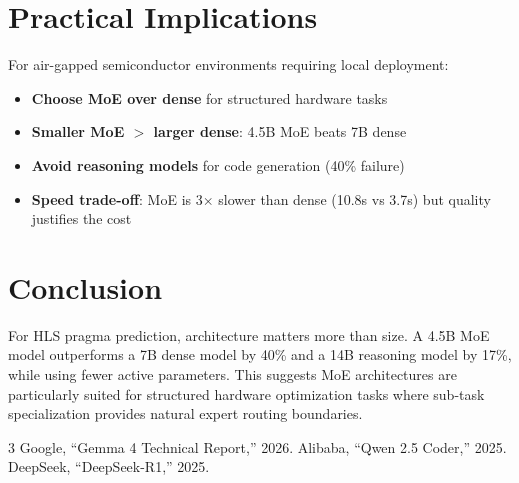 \documentclass[11pt]{article}
\begin{document}
\section{Practical Implications}

For air-gapped semiconductor environments requiring local deployment:
\begin{itemize}
    \item \textbf{Choose MoE over dense} for structured hardware tasks
    \item \textbf{Smaller MoE $>$ larger dense}: 4.5B MoE beats 7B dense
    \item \textbf{Avoid reasoning models} for code generation (40\% failure)
    \item \textbf{Speed trade-off}: MoE is 3$\times$ slower than dense
    (10.8s vs 3.7s) but quality justifies the cost
\end{itemize}

\section{Conclusion}

For HLS pragma prediction, architecture matters more than size.
A 4.5B MoE model outperforms a 7B dense model by 40\% and a 14B
reasoning model by 17\%, while using fewer active parameters.
This suggests MoE architectures are particularly suited for
structured hardware optimization tasks where sub-task specialization
provides natural expert routing boundaries.


\begin{thebibliography}{3}
 Google, ``Gemma 4 Technical Report,'' 2026.
 Alibaba, ``Qwen 2.5 Coder,'' 2025.
 DeepSeek, ``DeepSeek-R1,'' 2025.
\end{thebibliography}
\end{document}
